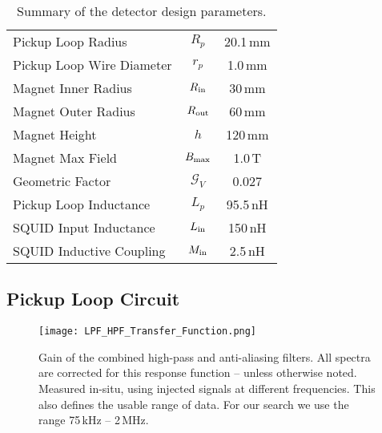 \documentclass[aps,prd,amsmath,amssymb,reprint,superscriptaddress, nofootinbib,
]{revtex4-1}
\begin{document}
\begin{table}
\centering
\caption{Summary of the \abra detector design parameters.}
\label{tab:DetectorDesign}
\begin{tabular}{lcc}
\hline
\hline
Pickup Loop Radius & $R_p$ & 20.1\,mm \\ Pickup Loop Wire Diameter & $r_p$ & 1.0\,mm \\
\hline
Magnet Inner Radius & $R_{\rm in}$ & 30\,mm \\
Magnet Outer Radius & $R_{\rm out}$ & 60\,mm \\
Magnet Height & $h$ & 120\,mm \\
\hline
Magnet Max Field & $B_{\rm max}$ & 1.0\,T\\
Geometric Factor & $\mathcal{G}_V$ & 0.027\\
\hline 
Pickup Loop Inductance & $L_p$ & 95.5\,nH \\
SQUID Input Inductance & $L_{\rm in}$ & 150\,nH\\
SQUID Inductive Coupling & $M_{\rm in}$ & 2.5\,nH\\
\hline
\hline
\end{tabular}
\end{table}



\subsection{Pickup Loop Circuit}
\label{sec:PickupLoop}
\begin{figure}
\centering
\texttt{[image: LPF\_HPF\_Transfer\_Function.png]}
\caption{Gain of the combined high-pass and anti-aliasing filters. All spectra are corrected for this response function -- unless otherwise noted. Measured in-situ, using injected signals at different frequencies. This also defines the usable range of data. For our search we use the range 75\,kHz -- 2\,MHz.}
\label{fig:FiltersResponse}
\end{figure}
\end{document}
